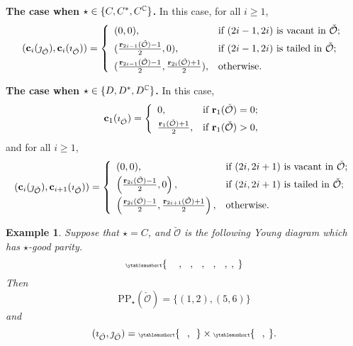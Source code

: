 \documentclass[12pt,a4paper]{amsart}
\let\ytb=\ytableaushort
\newcommand{\tytb}[1]{{\tiny\ytb{#1}}}
\newcommand{\CO}{{\mathcal {O}}}
\numberwithin{equation}{section}
\newtheorem{eg}[thm]{Example}
\theoremstyle{remark}
\begin{document}
\medskip

\noindent
{\bf The case when $\star\in \{C,C^*, C^{\mathbb{C}}\}$.} In this case, for all $i\geq 1$,
\[
(\mathbf c_{i}(\jmath_{\check \CO}), \mathbf c_{i}(\imath_{\check \CO}))=
   \left\{
     \begin{array}{ll}
        (0,  0), &\hbox{if $(2i-1, 2i)$ is vacant  in $\check \CO$};\smallskip\\
        (\frac{\mathbf r_{2i-1}(\check \CO)-1}{2},  0), & \hbox{if $(2i-1, 2i)$ is tailed in $\check \CO$};\smallskip\\
                  (\frac{\mathbf r_{2i-1}(\check \CO)-1}{2},  \frac{\mathbf r_{2i}(\check \CO)+1}{2}), &\hbox{otherwise}.\\
            \end{array}
   \right.
\]
\medskip

\noindent
{\bf The case when $\star\in \{D,D^*, D^{\mathbb{C}}\}$.} In this case,
 \[
   \mathbf c_{1}(\imath_{\check \CO})= \left\{
     \begin{array}{ll}
      0,  &\hbox{if $\mathbf r_1(\check \CO)=0$}; \smallskip\\
       \frac{\mathbf r_1(\check \CO)+1}{2},   &\hbox{if $\mathbf r_1(\check \CO)>0$},\\
            \end{array}
   \right.
 \]
and for all $i\geq 1$,
\[
(\mathbf c_{i}(\jmath_{\check \CO}), \mathbf c_{i+1}(\imath_{\check \CO}))=
   \left\{
     \begin{array}{ll}
        (0,  0), &\hbox{if $(2i, 2i+1)$ is vacant in $\check \CO$};\smallskip\\
      \left  (\frac{\mathbf r_{2i}(\check \CO)-1}{2},  0\right ), & \hbox{if $(2i, 2i+1)$ is tailed in $\check \CO$};\smallskip\\
                \left  (\frac{\mathbf r_{2i}(\check \CO)-1}{2},  \frac{\mathbf r_{2i+1}(\check \CO)+1}{2}\right ), &\hbox{otherwise}.\\
            \end{array}
   \right.
\]




\begin{eg} Suppose that $\star=C$, and $\check \CO$ is the following Young diagram which has $\star$-good parity.  
\begin{equation*}\label{eq:sp-nsp.C}
  \tytb{\ \ \ \ \  , \ \ \  , \ \ \ , \ \ \  , \ \ \ , \  ,\  }
   \end{equation*}
   Then 
\[
  \mathrm{PP}_\star(\check \CO)=\{(1,2), (5,6)\}
\]
and
\[
  (\imath_{\check \CO}, \jmath_{\check \CO})= \tytb{\ \ \ ,\ \  } \times \tytb{\ \ \ , \  }. 
\]
 
   
\end{eg}
\end{document}

